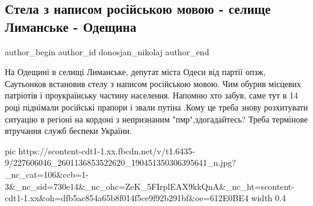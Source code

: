  
 
 
 
 
 
\subsection{Стела з написом російською мовою - селище Лиманське - Одещина}
\label{sec:01_08_2021.fb.donosjan_nikolaj.1.stela_jazyk_lymanske}
 
\ifcmt
 author_begin
   author_id donosjan_nikolaj
 author_end
\fi

На Одещині в селищі Лиманське, депутат міста Одеси від партії опзж, Саутьонков
встановив стелу з написом російською мовою. Чим обурив місцевих патріотів і
проукраїнську частину населення. Напомню хто забув, саме тут в 14 році піднімали
російські прапори і звали путіна .Кому це треба знову розхитувати ситуацію в
регіоні на кордоні з непризнаним "пмр",здогадайтесь? Треба термінове втручання
служб беспеки України.

\ifcmt
  pic https://scontent-cdt1-1.xx.fbcdn.net/v/t1.6435-9/227606046_2601136853522620_190451350306395641_n.jpg?_nc_cat=106&ccb=1-3&_nc_sid=730e14&_nc_ohc=ZeK_5FIrplEAX9kkQnA&_nc_ht=scontent-cdt1-1.xx&oh=dfb5ac854a65b8f014f5ce9f92b291bf&oe=612E0BE4
  width 0.4
\fi

